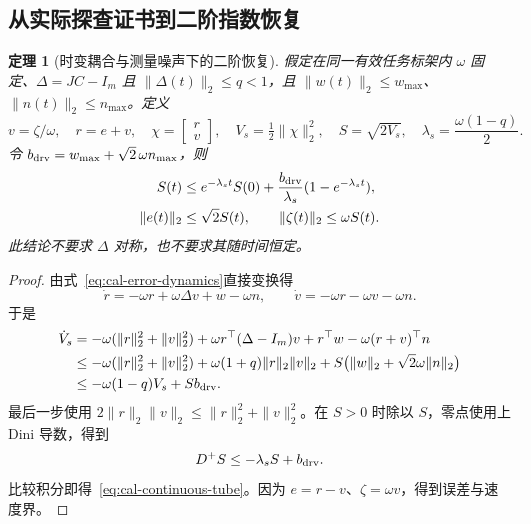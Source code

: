 \documentclass[11pt,a4paper]{article}
\numberwithin{equation}{section}
\newtheorem{theorem}{定理}[section]
\theoremstyle{definition}
\begin{document}
\subsection{从实际探查证书到二阶指数恢复}

\begin{theorem}[时变耦合与测量噪声下的二阶恢复]
\label{thm:cal-recovery}
假定在同一有效任务标架内 $\omega$ 固定、$\Delta=JC-I_m$ 且 $\|\Delta(t)\|_2\le q<1$，且
$\|w(t)\|_2\le w_{\max}$、$\|n(t)\|_2\le n_{\max}$。定义
\begin{equation}
 v=\zeta/\omega,\quad r=e+v,\quad
 \chi=\begin{bmatrix}r\\v\end{bmatrix},\quad
 V_s=\tfrac12\|\chi\|_2^2,\quad S=\sqrt{2V_s},
 \quad \lambda_s=\frac{\omega(1-q)}2.
 \label{eq:cal-servo-energy}
\end{equation}
令 $b_{\rm drv}=w_{\max}+\sqrt2\,\omega n_{\max}$，则
\begin{equation}
 \begin{aligned}
 S(t)&\le e^{-\lambda_st}S(0)
       +\frac{b_{\rm drv}}{\lambda_s}(1-e^{-\lambda_st}),\\
 \|e(t)\|_2&\le\sqrt2S(t),\qquad
 \|\zeta(t)\|_2\le\omega S(t).
 \end{aligned}
 \label{eq:cal-continuous-tube}
\end{equation}
此结论不要求 $\Delta$ 对称，也不要求其随时间恒定。
\end{theorem}

\begin{proof}
由式~\eqref{eq:cal-error-dynamics}直接变换得
\begin{equation}
 \dot r=-\omega r+\omega\Delta v+w-\omega n,
 \qquad
 \dot v=-\omega r-\omega v-\omega n.
 \label{eq:cal-servo-rv}
\end{equation}
于是
\begin{align}
 \dot V_s
 &=-\omega(\|r\|_2^2+\|v\|_2^2)
   +\omega r^\top(\Delta-I_m)v
   +r^\top w-\omega(r+v)^\top n\\
 &\le-\omega(\|r\|_2^2+\|v\|_2^2)
   +\omega(1+q)\|r\|_2\|v\|_2
   +S\bigl(\|w\|_2+\sqrt2\omega\|n\|_2\bigr)\\
 &\le-\omega(1-q)V_s+Sb_{\rm drv}.
 \label{eq:cal-servo-lyapunov}
\end{align}
最后一步使用 $2\|r\|_2\|v\|_2\le\|r\|_2^2+\|v\|_2^2$。在 $S>0$ 时除以 $S$，零点使用上 Dini 导数，得到
\begin{equation}
 D^+S\le-\lambda_sS+b_{\rm drv}.
\end{equation}
比较积分即得~\eqref{eq:cal-continuous-tube}。因为 $e=r-v$、$\zeta=\omega v$，得到误差与速度界。
\end{proof}
\end{document}
